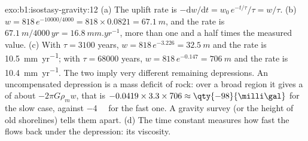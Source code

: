 \begin{solution}{exo:b1:isostasy-gravity:12}
(a) The uplift rate is $-\mathrm dw/\mathrm dt = w_0\,e^{-t/\tau}/\tau = w/\tau$.
(b) $w = 818\,e^{-10000/4000} = 818\times0.0821 = \qty{67.1}{m}$, and the rate is
$\qty{67.1}{m}/\num{4000}\,\unit{yr} = \qty{16.8}{mm.yr^{-1}}$, more than one
and a half times the measured value. (c) With $\tau = 3100$ years, $w =
818\,e^{-3.226} = \qty{32.5}{m}$ and the rate is \qty{10.5}{mm.yr^{-1}}; with
$\tau = \num{68000}$ years, $w = 818\,e^{-0.147} = \qty{706}{m}$ and the rate
is \qty{10.4}{mm.yr^{-1}}. The two imply very different remaining depressions.
An uncompensated depression is a mass deficit of  rock: over a broad
region it gives a  of about $-2\pi G\rho_m w$, that is
$-0.0419\times3.3\times706 \approx \qty{-98}{\milli\gal}$ for the slow case,
against \qty{-4}{\milli\gal} for the fast one. A gravity survey (or the height
of old shorelines) tells them apart. (d) The time constant measures how fast
the  flows back under the depression: its viscosity.
\end{solution}

